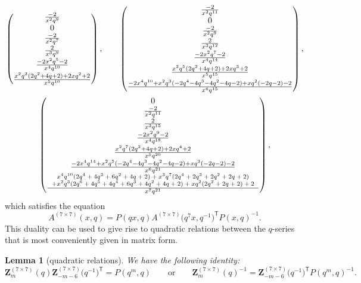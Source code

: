 \documentclass[pdftex]{sigma}
\numberwithin{equation}{section}
\newtheorem{Lemma}[Theorem]{Lemma}
\begin{document}
\begin{gather*}
\begin{pmatrix}
 \frac{-2}{x^2q^9} \\
 0 \\
 \frac{-2}{x^2q^7} \\[1mm]
 \frac{2}{x^3q^9} \\[1mm]
 \frac{-2x^2q^5 - 2}{x^4q^{10}} \\[1mm]
 \frac{x^2q^3(2q^2 + 4q + 2) + 2xq^2 + 2}{x^5q^{10}}
 \end{pmatrix} ,\qquad
 \begin{pmatrix}
 \frac{-2}{x^2q^{11}} \\
 0 \\
 \frac{-2}{x^2q^9} \\[1mm]
 \frac{2}{x^3q^{12}} \\[1mm]
 \frac{-2x^2q^7 - 2}{x^4q^{14}} \\[1mm]
 \frac{x^2q^5(2q^2 + 4q + 2) + 2xq^3 + 2}{x^5q^{15}} \\[1mm]
 \frac{-2x^4q^{10} +x^2q^3(- 2q^4 - 4q^3 - 4q^2 - 4q - 2) +xq^2(- 2q - 2) - 2}{x^6q^{15}}
 \end{pmatrix} ,\\
 \begin{pmatrix}
 0 \\
 \frac{-2}{x^2q^{11}} \\[1mm]
 \frac{2}{x^3q^{15}} \\[1mm]
 \frac{-2x^2q^9 - 2}{x^4q^{18}} \\[1mm]
 \frac{x^2q^7(2q^2 + 4q + 2) + 2xq^4 + 2}{x^5q^{20}} \\[1mm]
 \frac{-2x^4q^{14} + x^2q^5(- 2q^4 - 4q^3 - 4q^2 - 4q - 2) +xq^3(- 2q - 2) - 2}{x^6q^{21}} \\
 \frac{\text{\scriptsize $\begin{array}{c} x^4q^{10}(2q^4 + 4q^3 + 6q^2 + 4q + 2) + x^3q^7(2q^4 + 2q^3 + 2q^2 + 2q + 2) \\ + x^2q^3(2q^6 + 4q^5 + 4q^4 + 6q^3 + 4q^2 + 4q + 2) + xq^2(2q^2 + 2q + 2) + 2\end{array}$}}{x^7q^{21}}
 \end{pmatrix} ,
\end{gather*}
which satisfies the equation
\[%
 A^{(7\times 7)}(x,q)
  =
 P(qx,q)A^{(7\times 7)}\bigl(q^7x,q^{-1}\bigr)^{\mathsf{T}}P(x,q)^{-1} .
\]
This duality can be used to give rise to quadratic relations between the $q$-series that is most conveniently given in matrix form.
\begin{Lemma}[quadratic relations]\label{lem:quadrels7x7}
We have the following identity:
\[
 \mathbf{Z}_{m}^{(7\times 7)}(q)\mathbf{Z}_{-m-6}^{(7\times 7)}\bigl(q^{-1}\bigr)^{\mathsf{T}}
  =
 P(q^{m},q)
 \qquad\text{or}\qquad
 \mathbf{Z}_{m}^{(7\times 7)}(q)^{-1}
  =
 \mathbf{Z}_{-m-6}^{(7\times 7)}\bigl(q^{-1}\bigr)^{\mathsf{T}}P(q^{m},q)^{-1} .
\]
\end{Lemma}
\end{document}
